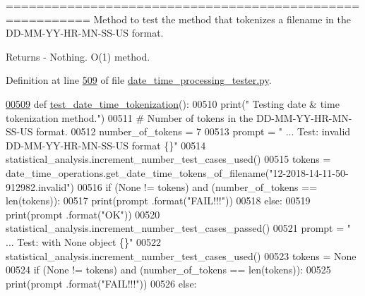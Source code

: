 ========================================================= Method to test the method that tokenizes a filename in the D\+D-\/\+M\+M-\/\+Y\+Y-\/\+H\+R-\/\+M\+N-\/\+S\+S-\/\+U\+S format. 

\begin{DoxyReturn}{Returns}
-\/ Nothing. O(1) method. 
\end{DoxyReturn}


Definition at line \hyperlink{date__time__processing__tester_8py_source_l00509}{509} of file \hyperlink{date__time__processing__tester_8py_source}{date\+\_\+time\+\_\+processing\+\_\+tester.\+py}.


\begin{DoxyCode}
\hypertarget{classutilities_1_1date__time__processing__tester_1_1date__time__operations__tester_l00509}{}\hyperlink{classutilities_1_1date__time__processing__tester_1_1date__time__operations__tester_ad2310ba49049da0632ac87e93dbecd4f}{00509}     \textcolor{keyword}{def }\hyperlink{classutilities_1_1date__time__processing__tester_1_1date__time__operations__tester_ad2310ba49049da0632ac87e93dbecd4f}{test\_date\_time\_tokenization}():
00510         print(\textcolor{stringliteral}{" Testing date & time tokenization method."})
00511         \textcolor{comment}{# Number of tokens in the DD-MM-YY-HR-MN-SS-US format.}
00512         number\_of\_tokens = 7
00513         prompt = \textcolor{stringliteral}{"  ... Test: invalid DD-MM-YY-HR-MN-SS-US format       \{\}"}
00514         statistical\_analysis.increment\_number\_test\_cases\_used()
00515         tokens = date\_time\_operations.get\_date\_time\_tokens\_of\_filename(\textcolor{stringliteral}{"12-2018-14-11-50-912982.invalid"})
00516         \textcolor{keywordflow}{if} (\textcolor{keywordtype}{None} != tokens) \textcolor{keywordflow}{and} (number\_of\_tokens == len(tokens)):
00517             print(prompt .format(\textcolor{stringliteral}{"FAIL!!!"}))
00518         \textcolor{keywordflow}{else}:
00519             print(prompt .format(\textcolor{stringliteral}{"OK"}))
00520             statistical\_analysis.increment\_number\_test\_cases\_passed()
00521         prompt = \textcolor{stringliteral}{"  ... Test: with None object              \{\}"}
00522         statistical\_analysis.increment\_number\_test\_cases\_used()
00523         tokens = \textcolor{keywordtype}{None}
00524         \textcolor{keywordflow}{if} (\textcolor{keywordtype}{None} != tokens) \textcolor{keywordflow}{and} (number\_of\_tokens == len(tokens)):
00525             print(prompt .format(\textcolor{stringliteral}{"FAIL!!!"}))
00526         \textcolor{keywordflow}{else}:

\end{DoxyCode}
